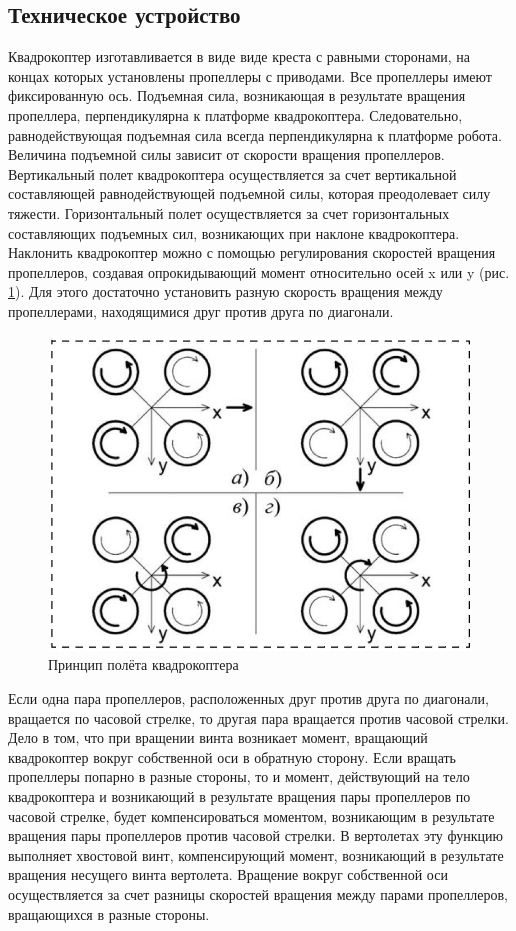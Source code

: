 \documentclass[a4paper, 14pt]{extarticle}
\begin{document}
\subsection{Техническое устройство}
Квадрокоптер изготавливается в виде
виде креста с равными сторонами, на концах которых установлены пропеллеры
с приводами. Все пропеллеры имеют фиксированную ось. Подъемная сила,
возникающая в результате вращения пропеллера, перпендикулярна к
платформе квадрокоптера. Следовательно, равнодействующая подъемная сила
всегда перпендикулярна к платформе робота. Величина подъемной силы
зависит от скорости вращения пропеллеров.
Вертикальный полет квадрокоптера осуществляется за счет вертикальной
составляющей равнодействующей подъемной силы, которая преодолевает силу
тяжести.
Горизонтальный полет осуществляется за счет горизонтальных
составляющих подъемных сил, возникающих при наклоне квадрокоптера.
Наклонить квадрокоптер можно с помощью регулирования скоростей вращения
пропеллеров, создавая опрокидывающий момент относительно осей x или y
(рис. \ref{fig:screenshot001}). Для этого достаточно установить разную скорость вращения между
пропеллерами, находящимися друг против друга по диагонали.
\begin{figure}[!htbp]
	\centering
	\includegraphics[width=0.7\linewidth]{others/screenshot001}
	\caption{Принцип полёта квадрокоптера}
	\label{fig:screenshot001}
\end{figure}
 
\par
Если одна пара пропеллеров, расположенных друг против друга по
диагонали, вращается по часовой стрелке, то другая пара вращается против
часовой стрелки. Дело в том, что при вращении винта возникает момент,
вращающий квадрокоптер вокруг собственной оси в обратную сторону. Если
вращать пропеллеры попарно в разные стороны, то и момент, действующий на
тело квадрокоптера и возникающий в результате вращения пары пропеллеров
по часовой стрелке, будет компенсироваться моментом, возникающим в
результате вращения пары пропеллеров против часовой стрелки. В вертолетах
эту функцию выполняет хвостовой винт, компенсирующий момент,
возникающий в результате вращения несущего винта вертолета. Вращение
вокруг собственной оси осуществляется за счет разницы скоростей вращения
между парами пропеллеров, вращающихся в разные стороны.
\end{document}
